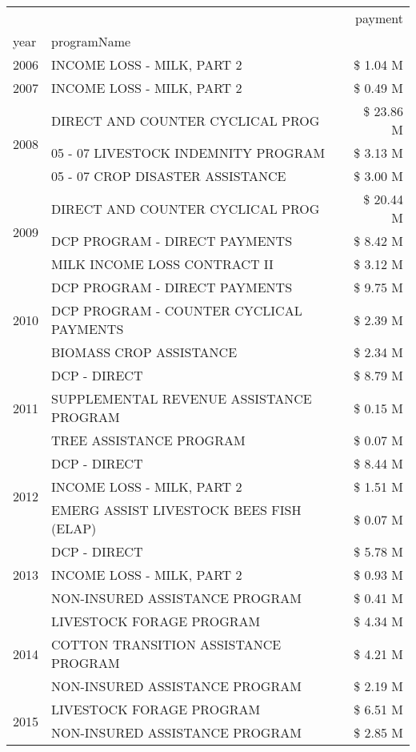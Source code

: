 \begin{tabular}{llr}
\toprule
 &  & payment \\
year & programName &  \\
\midrule
2006 & INCOME LOSS - MILK, PART 2 & \$ 1.04 M \\
\cline{1-3}
2007 & INCOME LOSS - MILK, PART 2 & \$ 0.49 M \\
\cline{1-3}
\multirow[t]{3}{*}{2008} & DIRECT AND COUNTER CYCLICAL PROG & \$ 23.86 M \\
 & 05 - 07 LIVESTOCK INDEMNITY PROGRAM & \$ 3.13 M \\
 & 05 - 07 CROP DISASTER ASSISTANCE & \$ 3.00 M \\
\cline{1-3}
\multirow[t]{3}{*}{2009} & DIRECT AND COUNTER CYCLICAL PROG & \$ 20.44 M \\
 & DCP PROGRAM - DIRECT PAYMENTS & \$ 8.42 M \\
 & MILK INCOME LOSS CONTRACT II & \$ 3.12 M \\
\cline{1-3}
\multirow[t]{3}{*}{2010} & DCP PROGRAM - DIRECT PAYMENTS & \$ 9.75 M \\
 & DCP PROGRAM - COUNTER CYCLICAL PAYMENTS & \$ 2.39 M \\
 & BIOMASS CROP ASSISTANCE & \$ 2.34 M \\
\cline{1-3}
\multirow[t]{3}{*}{2011} & DCP - DIRECT & \$ 8.79 M \\
 & SUPPLEMENTAL REVENUE ASSISTANCE PROGRAM & \$ 0.15 M \\
 & TREE ASSISTANCE PROGRAM & \$ 0.07 M \\
\cline{1-3}
\multirow[t]{3}{*}{2012} & DCP - DIRECT & \$ 8.44 M \\
 & INCOME LOSS - MILK, PART 2 & \$ 1.51 M \\
 & EMERG ASSIST LIVESTOCK BEES FISH (ELAP) & \$ 0.07 M \\
\cline{1-3}
\multirow[t]{3}{*}{2013} & DCP - DIRECT & \$ 5.78 M \\
 & INCOME LOSS - MILK, PART 2 & \$ 0.93 M \\
 & NON-INSURED ASSISTANCE PROGRAM & \$ 0.41 M \\
\cline{1-3}
\multirow[t]{3}{*}{2014} & LIVESTOCK FORAGE PROGRAM & \$ 4.34 M \\
 & COTTON TRANSITION ASSISTANCE PROGRAM & \$ 4.21 M \\
 & NON-INSURED ASSISTANCE PROGRAM & \$ 2.19 M \\
\cline{1-3}
\multirow[t]{3}{*}{2015} & LIVESTOCK FORAGE PROGRAM & \$ 6.51 M \\
 & NON-INSURED ASSISTANCE PROGRAM & \$ 2.85 M \\

\end{tabular}
